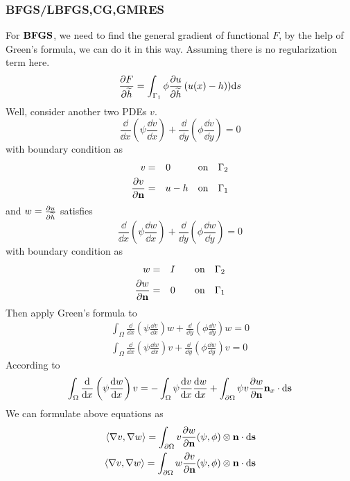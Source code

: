 \documentclass{note}
\begin{document}
\subsubsection{BFGS/LBFGS,CG,GMRES}
For $\mathbf{BFGS}$, we need to find the general gradient of functional $F$, by the help of Green's formula, we can do it in this way. Assuming there is no regularization term here.
\begin{equation}
\frac{\partial F}{\partial \widetilde{h}} = \int_{\Gamma_1} \phi \frac{\partial u}{\partial \widetilde{h}}\left(u(x)-h\right))\mathrm{d} s
\end{equation}
Well, consider another two PDEs \wrt $v$.
\begin{equation}
\frac{\dd}{\dd x}\left(\psi \frac{\dd v}{\dd x}\right) + \frac{\dd}{\dd y}\left(\phi \frac{\dd v}{\dd y}\right) = 0
\end{equation}
with boundary condition as
\begin{eqnarray}
v &=& 0 \quad\quad\;\;\;\mbox{on}\quad \Gamma_2 \\
\frac{\partial v}{\partial \mathbf{n}} &=& u-h \quad\mbox{on}\quad \Gamma_1
\end{eqnarray}
and $ w = \frac{\partial u}{\partial \widetilde{h}}$ satisfies
\begin{equation}
\frac{\dd}{\dd x}\left(\psi \frac{\dd w}{\dd x}\right) + \frac{\dd}{\dd y}\left(\phi \frac{\dd w}{\dd y}\right) = 0
\end{equation}
with boundary condition as
\begin{eqnarray}
w &=& I\quad\quad\mbox{on}\quad \Gamma_2 \\
\frac{\partial w}{\partial \mathbf{n}} &=& 0 \quad\quad\mbox{on}\quad \Gamma_1
\end{eqnarray}
Then apply Green's formula to
\begin{eqnarray}
\int_{\Omega} \frac{\dd}{\dd x}\left(\psi \frac{\dd v}{\dd x}\right)w + \frac{\dd}{\dd y}\left(\phi \frac{\dd v}{\dd y}\right)w = 0\\
\int_{\Omega}\frac{\dd}{\dd x}\left(\psi \frac{\dd w}{\dd x}\right)v + \frac{\dd}{\dd y}\left(\phi \frac{\dd w}{\dd y}\right)v = 0
\end{eqnarray}
According to
\begin{eqnarray}
\int_{\Omega} \frac{\mathrm{d}}{\mathrm{d} x}\left(\psi \frac{\mathrm{d} w}{\mathrm{d} x}\right)v = -\int_{\Omega}\psi\frac{\mathrm{d} v}{\mathrm{d} x}\frac{\mathrm{d} w}{\mathrm{d} x} + \int_{\partial\Omega} \psi v \frac{\partial w}{\partial \mathbf{n}} \mathbf{n}_x\cdot \mathrm{d}\mathbf{s}
\end{eqnarray}
We can formulate above equations as
\begin{eqnarray}
\langle \nabla v,\nabla w \rangle = \int_{\partial\Omega} v\frac{\partial w}{\partial \mathbf{n}} (\psi,\phi)\otimes\mathbf{n}\cdot \mathrm{d}\mathbf{s}\\
\langle \nabla v,\nabla w \rangle  = \int_{\partial\Omega} w\frac{\partial v}{\partial \mathbf{n}} (\psi,\phi)\otimes\mathbf{n}\cdot \mathrm{d}\mathbf{s}
\end{eqnarray}
\end{document}
